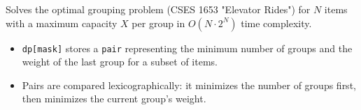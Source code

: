 
Solves the optimal grouping problem (CSES 1653 "Elevator Rides") for $N$ items with a maximum capacity $X$ per group in $O(N \cdot 2^N)$ time complexity.



\begin{itemize}
    \item \lstinline|dp[mask]| stores a \lstinline|pair| representing the minimum number of groups and the weight of the last group for a subset of items.
    \item Pairs are compared lexicographically: it minimizes the number of groups first, then minimizes the current group's weight.
\end{itemize}
